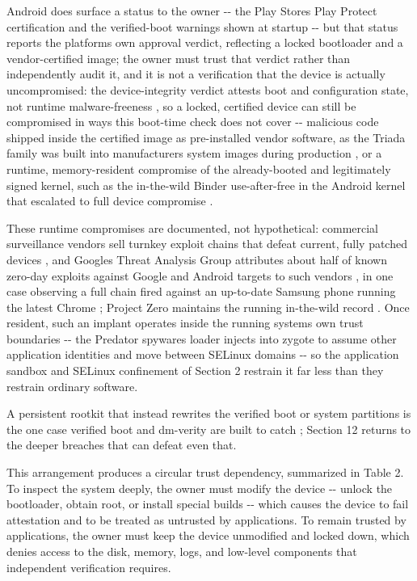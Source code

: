 \documentclass[
]{article}
\begin{document}
Android does surface a status to the owner -\/- the Play
Store\textquotesingle s Play Protect certification
\citep{play-protect-certification} and the verified-boot warnings shown
at startup \citep{aosp-boot-flow} -\/- but that status reports the
platform\textquotesingle s own approval verdict, reflecting a locked
bootloader and a vendor-certified image; the owner must trust that
verdict rather than independently audit it, and it is not a verification
that the device is actually uncompromised: the device-integrity verdict
attests boot and configuration state, not runtime malware-freeness
\citep{play-integrity-verdicts}, so a locked, certified device can still
be compromised in ways this boot-time check does not cover -\/-
malicious code shipped inside the certified image as pre-installed
vendor software, as the Triada family was built into
manufacturers\textquotesingle{} system images during production
\citep{google-triada}, or a runtime, memory-resident compromise of the
already-booted and legitimately signed kernel, such as the in-the-wild
Binder use-after-free in the Android kernel that escalated to full
device compromise \citep{projectzero-badbinder}.

These runtime compromises are documented, not hypothetical: commercial
surveillance vendors sell turnkey exploit chains that defeat current,
fully patched devices \citep{citizenlab-forcedentry}, and
Google\textquotesingle s Threat Analysis Group attributes about half of
known zero-day exploits against Google and Android targets to such
vendors \citep{tag-buying-spying}, in one case observing a full chain
fired against an up-to-date Samsung phone running the latest Chrome
\citep{tag-cytrox}; Project Zero maintains the running in-the-wild
record \citep{projectzero-itw}. Once resident, such an implant operates
inside the running system\textquotesingle s own trust boundaries -\/-
the Predator spyware\textquotesingle s loader injects into zygote to
assume other application identities and move between SELinux domains
\citep{talos-predator} -\/- so the application sandbox and SELinux
confinement of Section 2 restrain it far less than they restrain
ordinary software.

A persistent rootkit that instead rewrites the verified boot or system
partitions is the one case verified boot and dm-verity are built to
catch \citep{aosp-verified-boot}; Section 12 returns to the deeper
breaches that can defeat even that.

This arrangement produces a circular trust dependency, summarized in
Table 2. To inspect the system deeply, the owner must modify the device
-\/- unlock the bootloader, obtain root, or install special builds -\/-
which causes the device to fail attestation and to be treated as
untrusted by applications. To remain trusted by applications, the owner
must keep the device unmodified and locked down, which denies access to
the disk, memory, logs, and low-level components that independent
verification requires.
\end{document}

